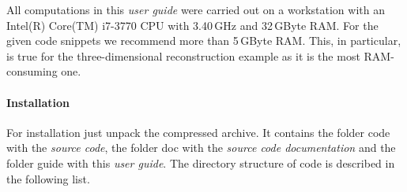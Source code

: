 \documentclass[a4paper]{article}
\begin{document}
All computations in this \emph{user guide} were carried out on a workstation with an Intel(R) Core(TM) i7-3770 CPU with 3.40\,GHz and 32\,GByte RAM. 
For the given code snippets we recommend more than 5\,GByte RAM. This, in particular, is true for the three-dimensional reconstruction example as it is the most RAM-consuming one.

\paragraph{Installation}
For installation just unpack the compressed archive. It contains the folder \textsf{code} with the \emph{source code}, the folder \textsf{doc} with the \emph{source code documentation} and the folder \textsf{guide} with this \emph{user guide}. The directory structure of \textsf{code} is described in the following list.
\end{document}
